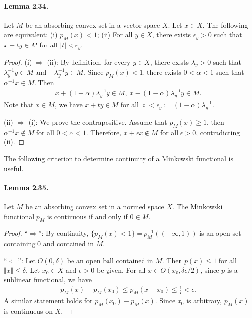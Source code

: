 \documentclass{article}
\begin{document}
\paragraph{Lemma 2.34.\label{lemma:2.34}} Let $M$ be an absorbing convex set in a vector space $X$. Let $x\in X$. The following are equivalent: (i) $p_M(x) < 1$; (ii) For all $y\in X$, there exists $\epsilon_y>0$ such that $x+ty\in M$ for all $\vert t\vert < \epsilon_y$.
\begin{proof}
(i) $\Rightarrow$ (ii): By definition, for every $y\in X$, there exists $\lambda_y>0$ such that $\lambda_y^{-1} y\in M$ and $-\lambda_y^{-1}y\in M$. Since $p_M(x)<1$, there exists $0< \alpha <1$ such that $\alpha^{-1} x\in M$. Then
\begin{align*}
	x + (1-\alpha)\lambda_y^{-1}y\in M,\ x - (1-\alpha)\lambda_y^{-1}y\in M.
\end{align*}
Note that $x\in M$, we have $x+ty\in M$ for all $\vert t\vert <\epsilon_y := (1-\alpha)\lambda_y^{-1}$.
\vspace{0.1cm}

(ii) $\Rightarrow$ (i): We prove the contrapositive. Assume that $p_M(x)\geq 1$, then $\alpha^{-1} x\notin M$ for all $0<\alpha < 1$. Therefore, $x+\epsilon x\notin M$ for all $\epsilon>0$, contradicting (ii).
\end{proof}

The following criterion to determine continuity of a Minkowski functional is useful.

\paragraph{Lemma 2.35.\label{lemma:2.35}} Let $M$ be an absorbing convex set in a normed space $X$. The Minkowski functional $p_M$ is continuous if and only if $0\in\mathring{M}$.
\begin{proof}
``$\Rightarrow$'': By continuity, $\{p_M(x)<1\} = p_M^{-1}((-\infty,1))$ is an open set containing $0$ and contained in $M$.
\vspace{0.1cm}

``$\Leftarrow$'': Let $O(0,\delta)$ be an open ball contained in $M$. Then $p(x)\leq 1$ for all $\Vert x\Vert\leq\delta$. Let $x_0\in X$ and $\epsilon>0$ be given. For all $x\in O(x_0,\delta\epsilon/2)$, since $p$ is a sublinear functional, we have
\begin{align*}
	p_M(x) - p_M(x_0) \leq p_M(x-x_0) \leq \frac{\epsilon}{2} < \epsilon.
\end{align*}
A similar statement holds for $p_M(x_0)-p_M(x)$. Since $x_0$ is arbitrary, $p_M(x)$ is continuous on $X$.
\end{proof}
\end{document}
